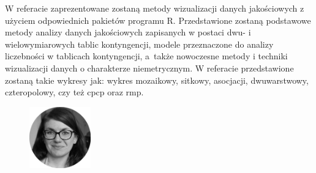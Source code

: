 \documentclass[\main/boa.tex]{subfiles}
\begin{document}
W referacie zaprezentowane zostaną metody wizualizacji danych jakościowych z użyciem odpowiednich pakietów programu R. Przedstawione zostaną podstawowe metody analizy danych jakościowych zapisanych w postaci dwu- i wielowymiarowych tablic kontyngencji, modele przeznaczone do analizy liczebności w tablicach kontyngencji, a~także nowoczesne metody i techniki wizualizacji danych o charakterze niemetrycznym. W referacie przedstawione zostaną takie wykresy jak: wykres mozaikowy, sitkowy, asocjacji, dwuwarstwowy, czteropolowy, czy też cpcp oraz rmp. 
\vspace{-10pt}
\bio
\begin{figure}
    \includegraphics[width=100px]{img/guests/czarno_biale/jbrzezinska.png}
\end{figure} 
\end{document}
